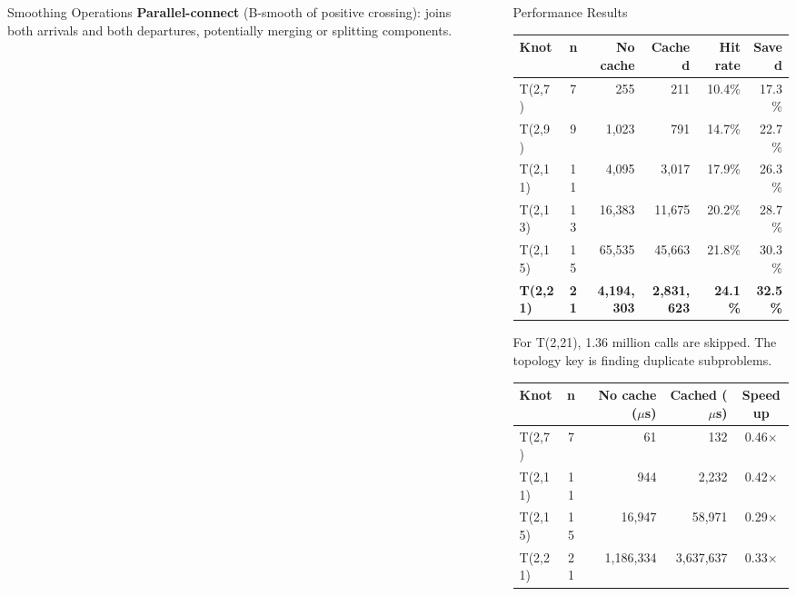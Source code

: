 \documentclass[final]{beamer}
\newlength{\sepwidth}
\newlength{\colwidth}
\newcommand{\separatorcolumn}{\begin{column}{\sepwidth}\end{column}}
\begin{document}
\begin{frame}[t,fragile]
\begin{columns}[t]
\begin{column}{\colwidth}
\begin{block}{Smoothing Operations}
    \textbf{Parallel-connect} (B-smooth of positive crossing): joins both arrivals and both departures, potentially merging or splitting components.
  \end{block}

\end{column}

\separatorcolumn

\begin{column}{\colwidth}

  \begin{block}{Performance Results}

    \begin{center}
    \begin{tabular}{lcrrrr}
    \toprule
    \textbf{Knot} & \textbf{n} & \textbf{No cache} & \textbf{Cached} & \textbf{Hit rate} & \textbf{Saved} \\
    \midrule
    T(2,7)  &  7 &       255 &       211 & 10.4\% & 17.3\% \\
    T(2,9)  &  9 &     1,023 &       791 & 14.7\% & 22.7\% \\
    T(2,11) & 11 &     4,095 &     3,017 & 17.9\% & 26.3\% \\
    T(2,13) & 13 &    16,383 &    11,675 & 20.2\% & 28.7\% \\
    T(2,15) & 15 &    65,535 &    45,663 & 21.8\% & 30.3\% \\
    \textbf{T(2,21)} & \textbf{21} & \textbf{4,194,303} & \textbf{2,831,623} & \textbf{24.1\%} & \textbf{32.5\%} \\
    \bottomrule
    \end{tabular}
    \end{center}

    \vspace{0.1cm}
    For T(2,21), 1.36 million calls are skipped. The topology key is finding duplicate subproblems.

    \vspace{0.15cm}

    \begin{center}
    \begin{tabular}{lcrrc}
    \toprule
    \textbf{Knot} & \textbf{n} & \textbf{No cache ($\mu$s)} & \textbf{Cached ($\mu$s)} & \textbf{Speedup} \\
    \midrule
    T(2,7)  &  7 &        61 &        132 & 0.46$\times$ \\
    T(2,11) & 11 &       944 &      2{,}232 & 0.42$\times$ \\
    T(2,15) & 15 &    16{,}947 &    58{,}971 & 0.29$\times$ \\
    T(2,21) & 21 & 1{,}186{,}334 & 3{,}637{,}637 & 0.33$\times$ \\
    \bottomrule
    \end{tabular}
    \end{center}


\end{block}
\end{column}
\end{columns}
\end{frame}
\end{document}
